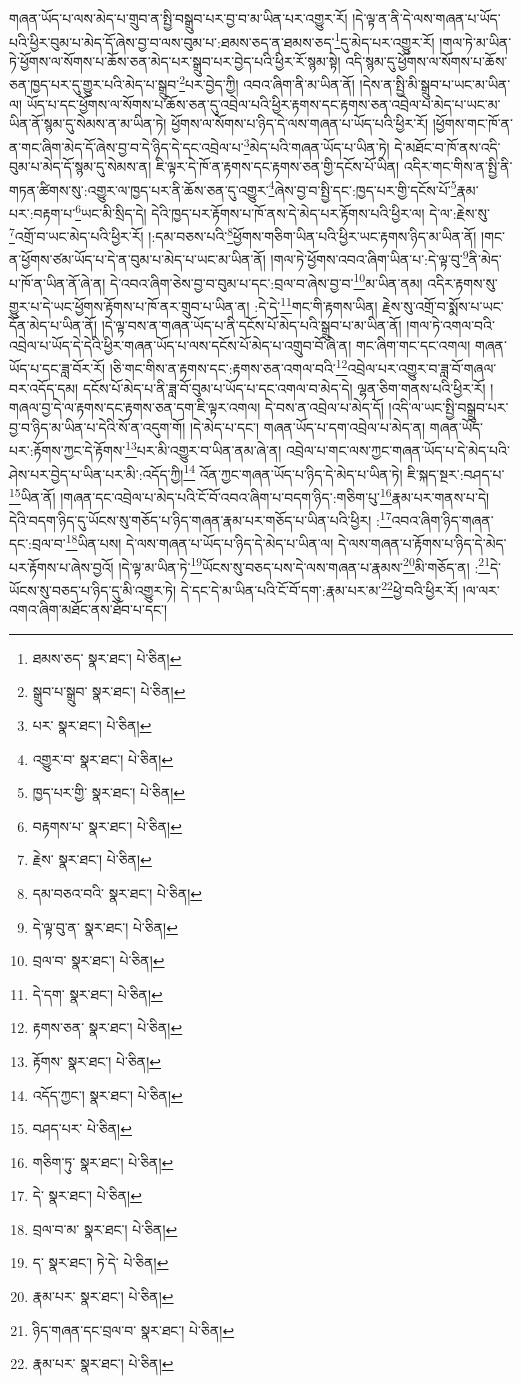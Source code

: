 གཞན་ཡོད་པ་ལས་མེད་པ་གྲུབ་ན་སྤྱི་བསྒྲུབ་པར་བྱ་བ་མ་ཡིན་པར་འགྱུར་རོ། །དེ་ལྟ་ན་ནི་དེ་ལས་གཞན་པ་ཡོད་པའི་ཕྱིར་བུམ་པ་མེད་དོ་ཞེས་བྱ་བ་ལས་བུམ་པ་:ཐམས་ཅད་ན་ཐམས་ཅད་\footnote{ཐམས་ཅད་  སྣར་ཐང་།  པེ་ཅིན། }དུ་མེད་པར་འགྱུར་རོ། །གལ་ཏེ་མ་ཡིན་ཏེ་ཕྱོགས་ལ་སོགས་པ་ཆོས་ཅན་མེད་པར་སྒྲུབ་པར་བྱེད་པའི་ཕྱིར་རོ་སྙམ་སྟེ། འདི་སྙམ་དུ་ཕྱོགས་ལ་སོགས་པ་ཆོས་ཅན་ཁྱད་པར་དུ་གྱུར་པའི་མེད་པ་སྒྲུབ་\footnote{སྒྲུབ་པ་སྒྲུབ་  སྣར་ཐང་།  པེ་ཅིན། }པར་བྱེད་ཀྱི། འབའ་ཞིག་ནི་མ་ཡིན་ནོ། །དེས་ན་སྤྱི་མི་སྒྲུབ་པ་ཡང་མ་ཡིན་ལ། ཡོད་པ་དང་ཕྱོགས་ལ་སོགས་པ་ཆོས་ཅན་དུ་འབྲེལ་པའི་ཕྱིར་རྟགས་དང་རྟགས་ཅན་འབྲེལ་པ་མེད་པ་ཡང་མ་ཡིན་ནོ་སྙམ་དུ་སེམས་ན་མ་ཡིན་ཏེ། ཕྱོགས་ལ་སོགས་པ་ཉིད་དེ་ལས་གཞན་པ་ཡོད་པའི་ཕྱིར་རོ། །ཕྱོགས་གང་ཁོ་ན་ན་གང་ཞིག་མེད་དོ་ཞེས་བྱ་བ་དེ་ཉིད་དེ་དང་འབྲེལ་པ་\footnote{པར་  སྣར་ཐང་།  པེ་ཅིན། }མེད་པའི་གཞན་ཡོད་པ་ཡིན་ཏེ། དེ་མཐོང་བ་ཁོ་ནས་འདི་བུམ་པ་མེད་དོ་སྙམ་དུ་སེམས་ན། ཇི་ལྟར་དེ་ཁོ་ན་རྟགས་དང་རྟགས་ཅན་གྱི་དངོས་པོ་ཡིན། འདིར་གང་གིས་ན་སྤྱི་ནི་གཏན་ཚིགས་སུ་:འགྱུར་ལ་ཁྱད་པར་ནི་ཆོས་ཅན་དུ་འགྱུར་\footnote{འགྱུར་བ་  སྣར་ཐང་།  པེ་ཅིན། }ཞེས་བྱ་བ་སྤྱི་དང་:ཁྱད་པར་གྱི་དངོས་པོ་\footnote{ཁྱད་པར་གྱི་  སྣར་ཐང་།  པེ་ཅིན། }རྣམ་པར་:བརྟག་པ་\footnote{བརྟགས་པ་  སྣར་ཐང་།  པེ་ཅིན། }ཡང་མི་སྲིད་དེ། དེའི་ཁྱད་པར་རྟོགས་པ་ཁོ་ནས་དེ་མེད་པར་རྟོགས་པའི་ཕྱིར་ལ། དེ་ལ་:རྗེས་སུ་\footnote{རྗེས་  སྣར་ཐང་།  པེ་ཅིན། }འགྲོ་བ་ཡང་མེད་པའི་ཕྱིར་རོ། །:དམ་བཅས་པའི་\footnote{དམ་བཅའ་བའི་  སྣར་ཐང་།  པེ་ཅིན། }ཕྱོགས་གཅིག་ཡིན་པའི་ཕྱིར་ཡང་རྟགས་ཉིད་མ་ཡིན་ནོ། །གང་ན་ཕྱོགས་ཙམ་ཡོད་པ་དེ་ན་བུམ་པ་མེད་པ་ཡང་མ་ཡིན་ནོ། །གལ་ཏེ་ཕྱོགས་འབའ་ཞིག་ཡིན་པ་:དེ་ལྟ་བུ་\footnote{དེ་ལྟ་བུ་ན་  སྣར་ཐང་།  པེ་ཅིན། }ནི་མེད་པ་ཁོ་ན་ཡིན་ནོ་ཞེ་ན། དེ་འབའ་ཞིག་ཅེས་བྱ་བ་བུམ་པ་དང་:བྲལ་བ་ཞེས་བྱ་བ་\footnote{བྲལ་བ་  སྣར་ཐང་།  པེ་ཅིན། }མ་ཡིན་ནམ། འདིར་རྟགས་སུ་གྱུར་པ་དེ་ཡང་ཕྱོགས་རྟོགས་པ་ཁོ་ནར་གྲུབ་པ་ཡིན་ན། :དེ་དེ་\footnote{དེ་དག་  སྣར་ཐང་།  པེ་ཅིན། }གང་གི་རྟགས་ཡིན། རྗེས་སུ་འགྲོ་བ་སྨོས་པ་ཡང་དོན་མེད་པ་ཡིན་ནོ། །དེ་ལྟ་བས་ན་གཞན་ཡོད་པ་ནི་དངོས་པོ་མེད་པའི་སྒྲུབ་པ་མ་ཡིན་ནོ། །གལ་ཏེ་འགལ་བའི་འབྲེལ་པ་ཡོད་དེ་དེའི་ཕྱིར་གཞན་ཡོད་པ་ལས་དངོས་པོ་མེད་པ་འགྲུབ་བོ་ཞེ་ན། གང་ཞིག་གང་དང་འགལ། གཞན་ཡོད་པ་དང་ཟླ་བོར་རོ། །ཅི་གང་གིས་ན་རྟགས་དང་:རྟགས་ཅན་འགལ་བའི་\footnote{རྟགས་ཅན་  སྣར་ཐང་།  པེ་ཅིན། }འབྲེལ་པར་འགྱུར་བ་ཟླ་བོ་གཞལ་བར་འདོད་དམ། དངོས་པོ་མེད་པ་ནི་ཟླ་བོ་བུམ་པ་ཡོད་པ་དང་འགལ་བ་མེད་དེ། ལྷན་ཅིག་གནས་པའི་ཕྱིར་རོ། །གཞལ་བྱ་དེ་ལ་རྟགས་དང་རྟགས་ཅན་དག་ཇི་ལྟར་འགལ། དེ་བས་ན་འབྲེལ་པ་མེད་དོ། །འདི་ལ་ཡང་སྤྱི་བསྒྲུབ་པར་བྱ་བ་ཉིད་མ་ཡིན་པ་དེའི་སོ་ན་འདུག་གོ། །དེ་མེད་པ་དང་། གཞན་ཡོད་པ་དག་འབྲེལ་པ་མེད་ན། གཞན་ཡོད་པར་:རྟོགས་ཀྱང་དེ་རྟོགས་\footnote{རྟོགས་  སྣར་ཐང་།  པེ་ཅིན། }པར་མི་འགྱུར་བ་ཡིན་ནམ་ཞེ་ན། འབྲེལ་པ་གང་ལས་ཀྱང་གཞན་ཡོད་པ་དེ་མེད་པའི་ཤེས་པར་བྱེད་པ་ཡིན་པར་མི་:འདོད་ཀྱི།\footnote{འདོད་ཀྱང་།  སྣར་ཐང་།  པེ་ཅིན། } འོན་ཀྱང་གཞན་ཡོད་པ་ཉིད་དེ་མེད་པ་ཡིན་ཏེ། ཇི་སྐད་སྔར་:བཤད་པ་\footnote{བཤད་པར་  པེ་ཅིན། }ཡིན་ནོ། །གཞན་དང་འབྲེལ་པ་མེད་པའི་ངོ་བོ་འབའ་ཞིག་པ་བདག་ཉིད་:གཅིག་པུ་\footnote{གཅིག་ཏུ་  སྣར་ཐང་།  པེ་ཅིན། }རྣམ་པར་གནས་པ་དེ། དེའི་བདག་ཉིད་དུ་ཡོངས་སུ་གཅོད་པ་ཉིད་གཞན་རྣམ་པར་གཅོད་པ་ཡིན་པའི་ཕྱིར། :\footnote{དེ་  སྣར་ཐང་།  པེ་ཅིན། }འབའ་ཞིག་ཉིད་གཞན་དང་:བྲལ་བ་\footnote{བྲལ་བ་མ་  སྣར་ཐང་།  པེ་ཅིན། }ཡིན་པས། དེ་ལས་གཞན་པ་ཡོད་པ་ཉིད་དེ་མེད་པ་ཡིན་ལ། དེ་ལས་གཞན་པ་རྟོགས་པ་ཉིད་དེ་མེད་པར་རྟོགས་པ་ཞེས་བྱའོ། །དེ་ལྟ་མ་ཡིན་ཏེ་\footnote{ད་  སྣར་ཐང་། ཏེ་དེ་  པེ་ཅིན། }ཡོངས་སུ་བཅད་པས་དེ་ལས་གཞན་པ་རྣམས་\footnote{རྣམ་པར་  སྣར་ཐང་།  པེ་ཅིན། }མི་གཅོད་ན། :\footnote{ཉིད་གཞན་དང་བྲལ་བ་  སྣར་ཐང་།  པེ་ཅིན། }དེ་ཡོངས་སུ་བཅད་པ་ཉིད་དུ་མི་འགྱུར་ཏེ། དེ་དང་དེ་མ་ཡིན་པའི་ངོ་བོ་དག་:རྣམ་པར་མ་\footnote{རྣམ་པར་  སྣར་ཐང་།  པེ་ཅིན། }ཕྱེ་བའི་ཕྱིར་རོ། །ལ་ལར་འགའ་ཞིག་མཐོང་ནས་ཐོབ་པ་དང་། 